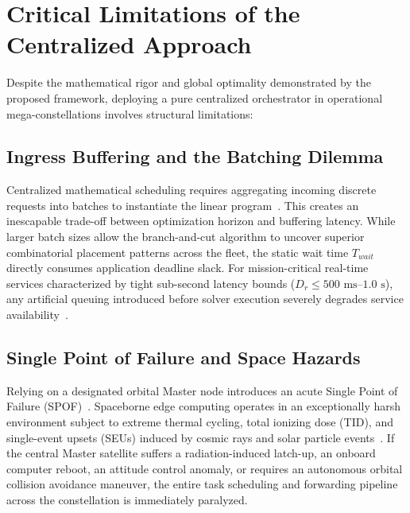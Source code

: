 \section{Critical Limitations of the Centralized Approach}
\label{sec:concl_limitations}

Despite the mathematical rigor and global optimality demonstrated by the proposed framework, deploying a pure centralized orchestrator in operational mega-constellations involves structural limitations:

\subsection{Ingress Buffering and the Batching Dilemma}
\label{subsec:limitations_batching}

Centralized mathematical scheduling requires aggregating incoming discrete requests into batches to instantiate the linear program~\cite{wolsey1998integer, boyd2004convex}. This creates an inescapable trade-off between optimization horizon and buffering latency.
While larger batch sizes allow the branch-and-cut algorithm to uncover superior combinatorial placement patterns across the fleet, the static wait time $T_{wait}$ directly consumes application deadline slack. For mission-critical real-time services characterized by tight sub-second latency bounds ($D_r \le 500\text{ ms}\text{--}1.0\text{ s}$), any artificial queuing introduced before solver execution severely degrades service availability~\cite{leyva2023satellite}.

\subsection{Single Point of Failure and Space Hazards}
\label{subsec:limitations_spof}

Relying on a designated orbital Master node introduces an acute Single Point of Failure (SPOF)~\cite{denby2020asplos}. Spaceborne edge computing operates in an exceptionally harsh environment subject to extreme thermal cycling, total ionizing dose (TID), and single-event upsets (SEUs) induced by cosmic rays and solar particle events~\cite{denby2019orbital, denby2020asplos}. If the central Master satellite suffers a radiation-induced latch-up, an onboard computer reboot, an attitude control anomaly, or requires an autonomous orbital collision avoidance maneuver, the entire task scheduling and forwarding pipeline across the constellation is immediately paralyzed.


